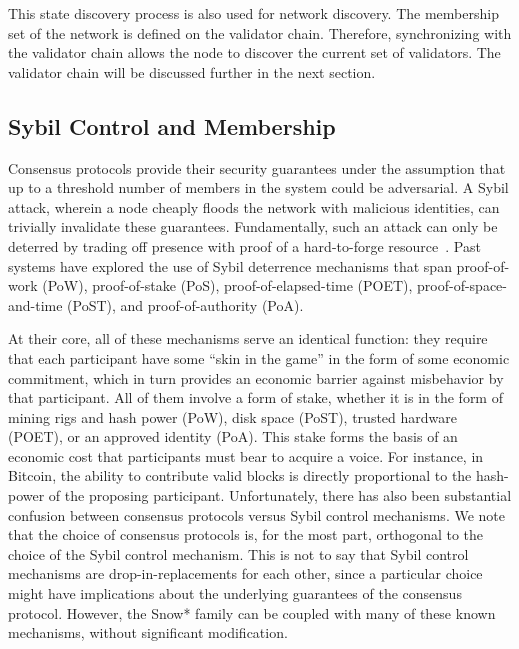 \documentclass[runningheads]{llncs}
\begin{document}

This state discovery process is also used for network discovery. The membership set of the network is defined on the validator chain. Therefore, synchronizing with the validator chain allows the node to discover the current set of validators. The validator chain will be discussed further in the next section.

\subsection{Sybil Control and Membership}
Consensus protocols provide their security guarantees under the assumption that up to a threshold number of members in the system could be adversarial.
A Sybil attack, wherein a node cheaply floods the network with malicious identities, can trivially invalidate these guarantees. 
Fundamentally, such an attack can only be deterred by trading off presence with proof of a hard-to-forge resource~\cite{douceur2002sybil}. 
Past systems have explored the use of Sybil deterrence mechanisms that span proof-of-work (PoW), proof-of-stake (PoS), proof-of-elapsed-time (POET), proof-of-space-and-time (PoST), and proof-of-authority (PoA).

At their core, all of these mechanisms serve an identical function: they require that each participant have some ``skin in the game'' in the form of some economic commitment, which in turn provides an economic barrier against misbehavior by that participant. 
All of them involve a form of stake, whether it is in the form of mining rigs and hash power (PoW), disk space (PoST), trusted hardware (POET), or an approved identity (PoA). 
This stake forms the basis of an economic cost that participants must bear to acquire a voice. 
For instance, in Bitcoin, the ability to contribute valid blocks is directly proportional to the hash-power of the proposing participant.
Unfortunately, there has also been substantial confusion between consensus protocols versus Sybil control mechanisms.
We note that the choice of consensus protocols is, for the most part, orthogonal to the choice of the Sybil control mechanism. 
This is not to say that Sybil control mechanisms are drop-in-replacements for each other, since a particular choice might have implications about the underlying guarantees of the consensus protocol. 
However, the Snow* family can be coupled with many of these known mechanisms, without significant modification. 
\end{document}
